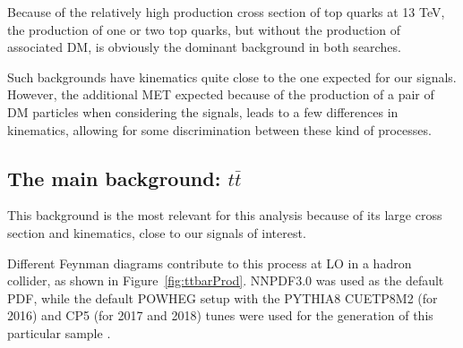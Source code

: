 \documentclass[a4paper, 10pt, openright]{report}
\begin{document}
Because of the relatively high production cross section of top quarks at 13 TeV, the production of one or two top quarks, but without the production of associated \ac{DM}, is obviously the dominant background in both searches. 

Such backgrounds have kinematics quite close to the one expected for our signals. However, the additional \ac{MET} expected because of the production of a pair of \ac{DM} particles when considering the signals, leads to a few differences in kinematics, allowing for some discrimination between these kind of processes. %

\subsection{The main background: $t \bar t$} \label{subsection:ttbar}


This background is the most relevant for this analysis because of its large cross section and kinematics, close to our signals of interest.

Different Feynman diagrams contribute to this process at \ac{LO} in a hadron collider, as shown in Figure~\ref{fig:ttbarProd}. NNPDF3.0 \cite{NNPDF} was used as the default \ac{PDF}, while the default POWHEG setup with the PYTHIA8 CUETP8M2 (for 2016) and CP5 (for 2017 and 2018) tunes were used for the generation of this particular sample \cite{PythiaTunes}.
\end{document}
